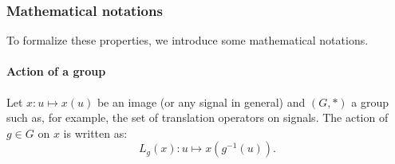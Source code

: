         \subsubsection{Mathematical notations}
            To formalize these properties, we introduce some mathematical notations.
            \paragraph{Action of a group}
                Let $x: u \mapsto x(u)$ be an image (or any signal in general) and $(G, *)$ a group such as, for example, the set of translation operators on signals.
                The action of $g\in G$ on $x$ is written as:
                \begin{equation}
                    \label{eq::action_group}
                    L_g(x): u \mapsto x\left(g^{-1}(u)\right).
                \end{equation}
            
